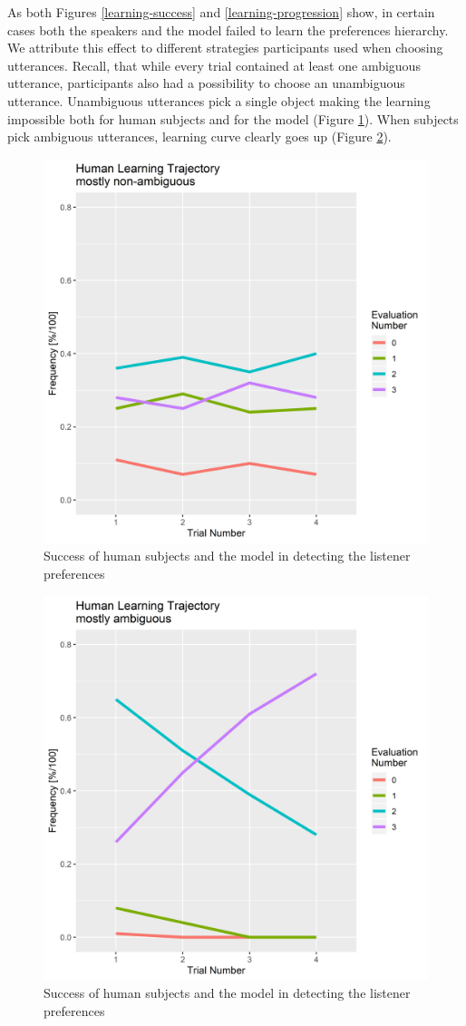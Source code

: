\documentclass[10pt,a4paper]{article}
\begin{document}
As both Figures \ref{learning-success} and \ref{learning-progression} show, in certain cases both the speakers and the model failed to learn the preferences hierarchy. We attribute this effect to different strategies participants used when choosing utterances. Recall, that while every trial contained at least one ambiguous utterance, participants also had a possibility to choose an unambiguous utterance. Unambiguous utterances pick a single object making the learning impossible both for human subjects and for the model (Figure \ref{learning-unambiguous}). When subjects pick ambiguous utterances, learning curve clearly goes up (Figure \ref{learning-ambiguous}).

\begin{figure}
	\centering
	\includegraphics[width=.5\linewidth]{images/LearningProcessLinePlotHuman3.png}
	\caption{Success of human subjects and the model in detecting the listener preferences}
	\label{learning-unambiguous}
\end{figure}

\begin{figure}
	\centering
	\includegraphics[width=.5\linewidth]{images/LearningProcessLinePlotHuman2.png}
	\caption{Success of human subjects and the model in detecting the listener preferences}
	\label{learning-ambiguous}
\end{figure}
\end{document}
